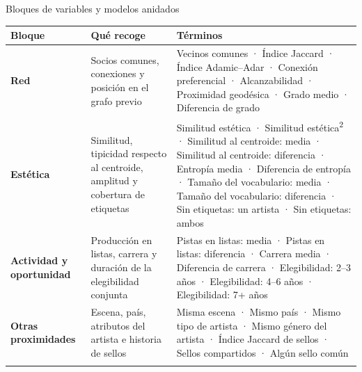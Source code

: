 \documentclass[
  8pt,
  ignorenonframetext,
  aspectratio=169,
  spanish,
]{beamer}
\newcommand{\lightrowrule}{\arrayrulecolor{black!25}\specialrule{0.4pt}{1pt}{1pt}\arrayrulecolor{black}}
\begin{document}
\begin{frame}{Bloques de variables y modelos anidados}
\label{bloques-de-variables-y-modelos-anidados}
~

\begin{longtable}[]{@{}
  >{\raggedright\arraybackslash}p{}
  >{\raggedright\arraybackslash}p{}
  >{\raggedright\arraybackslash}p{}@{}}
\toprule\noalign{}
\begin{minipage}[b]{\linewidth}\raggedright
Bloque
\end{minipage} & \begin{minipage}[b]{\linewidth}\raggedright
Qué recoge
\end{minipage} & \begin{minipage}[b]{\linewidth}\raggedright
Términos
\end{minipage} \\
\midrule\noalign{}
\endhead
\bottomrule\noalign{}
\endlastfoot
\textbf{Red} & Socios comunes, conexiones y posición en el grafo previo
& Vecinos comunes · Índice Jaccard · Índice Adamic--Adar · Conexión
preferencial · Alcanzabilidad · Proximidad geodésica · Grado medio ·
Diferencia de grado \\ \lightrowrule
\textbf{Estética} & Similitud, tipicidad respecto al centroide, amplitud
y cobertura de etiquetas & Similitud estética · Similitud
estética\textsuperscript{2} · Similitud al centroide: media · Similitud
al centroide: diferencia · Entropía media · Diferencia de entropía ·
Tamaño del vocabulario: media · Tamaño del vocabulario: diferencia · Sin
etiquetas: un artista · Sin etiquetas: ambos \\ \lightrowrule
\textbf{Actividad y oportunidad} & Producción en listas, carrera y
duración de la elegibilidad conjunta & Pistas en listas: media · Pistas
en listas: diferencia · Carrera media · Diferencia de carrera ·
Elegibilidad: 2--3 años · Elegibilidad: 4--6 años · Elegibilidad: 7+
años \\ \lightrowrule
\textbf{Otras proximidades} & Escena, país, atributos del artista e
historia de sellos & Misma escena · Mismo país · Mismo tipo de artista ·
Mismo género del artista · Índice Jaccard de sellos · Sellos compartidos
· Algún sello común \\ \lightrowrule
\end{longtable}

~

\begin{tcolorbox}[enhanced jigsaw, arc=.35mm, bottomtitle=1mm, colbacktitle=quarto-callout-note-color!10!white, breakable, toprule=.15mm, coltitle=black, colback=white, rightrule=.15mm, colframe=quarto-callout-note-color-frame, leftrule=.75mm, toptitle=1mm, opacitybacktitle=0.6, opacityback=0, title={Nota}, titlerule=0mm, bottomrule=.15mm, left=2mm]


\end{tcolorbox}
\end{frame}
\end{document}
